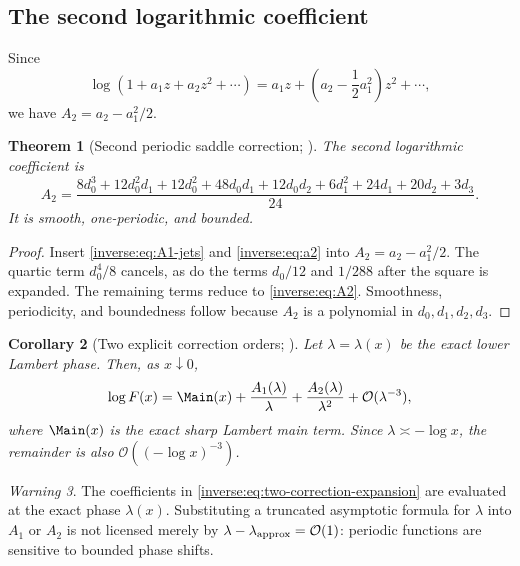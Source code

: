 \documentclass[11pt,oneside]{article}
\newtheorem{theorem}{Theorem}[section]
\newtheorem{corollary}[theorem]{Corollary}
\theoremstyle{definition}
\theoremstyle{remark}
\newtheorem{warning}[theorem]{Warning}
\newcommand{\bigO}{\mathcal O}
\begin{document}
\subsection{The second logarithmic coefficient}

Since
\[
 \log(1+a_1z+a_2z^2+\cdots)
 =a_1z+\left(a_2-\frac12a_1^2\right)z^2+\cdots,
\]
we have $A_2=a_2-a_1^2/2$.

\begin{theorem}[Second periodic saddle correction; \Formalized]
\label{inverse:thm:A2}
The second logarithmic coefficient is
\begin{equation}
 \boxed{
 A_2=
 \frac{
  8d_0^3+12d_0^2d_1+12d_0^2+48d_0d_1+12d_0d_2
  +6d_1^2+24d_1+20d_2+3d_3
 }{24}.}
 \label{inverse:eq:A2}
\end{equation}
It is smooth, one-periodic, and bounded.
\end{theorem}

\begin{proof}
Insert \eqref{inverse:eq:A1-jets} and \eqref{inverse:eq:a2} into
$A_2=a_2-a_1^2/2$.  The quartic term $d_0^4/8$ cancels, as do the
terms $d_0/12$ and $1/288$ after the square is expanded.  The remaining
terms reduce to \eqref{inverse:eq:A2}.  Smoothness, periodicity, and boundedness
follow because $A_2$ is a polynomial in $d_0,d_1,d_2,d_3$.
\end{proof}

\begin{corollary}[Two explicit correction orders; \Formalized]
\label{inverse:cor:two-corrections}
Let $\lambda=\lambda(x)$ be the exact lower Lambert phase.  Then, as
$x\downarrow0$,
\begin{equation}
 \log F(x)
 =\Main(x)+\frac{A_1(\lambda)}{\lambda}
          +\frac{A_2(\lambda)}{\lambda^2}
          +\bigO(\lambda^{-3}), \label{inverse:eq:two-correction-expansion}
\end{equation}
where $\Main(x)$ is the exact sharp Lambert main term.  Since
$\lambda\asymp-\log x$, the remainder is also
$\bigO((-\log x)^{-3})$.
\end{corollary}

\begin{warning}
The coefficients in \eqref{inverse:eq:two-correction-expansion} are evaluated at
the exact phase $\lambda(x)$.  Substituting a truncated asymptotic formula
for $\lambda$ into $A_1$ or $A_2$ is not licensed merely by
$\lambda-\lambda_{\rm approx}=\bigO(1)$: periodic functions are sensitive
to bounded phase shifts.
\end{warning}
\end{document}
